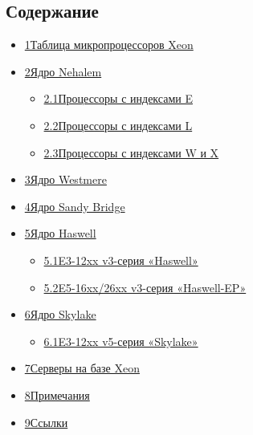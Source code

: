 \documentclass[a4paper,11pt]{article}
\begin{document}
\subsection{Содержание}
\begin{itemize}
	\item \hyperlink{Таблица_микропроцессоров_Xeon}{1Таблица микропроцессоров Xeon}
	\item \hyperlink{Ядро_Nehalem}{2Ядро Nehalem}
\begin{itemize}
	\item \hyperlink{Процессоры_с_индексами_E}{2.1Процессоры с индексами E}
	\item \hyperlink{Процессоры_с_индексами_L}{2.2Процессоры с индексами L}
	\item \hyperlink{Процессоры_с_индексами_W_и_X}{2.3Процессоры с индексами W и X}
\end{itemize}
	\item \hyperlink{Ядро_Westmere}{3Ядро Westmere}
	\item \hyperlink{Ядро_Sandy_Bridge}{4Ядро Sandy Bridge}
	\item \hyperlink{Ядро_Haswell}{5Ядро Haswell}
\begin{itemize}
	\item \hyperlink{E3-12xx_v3-серия_«Haswell»}{5.1E3-12xx v3-серия «Haswell»}
	\item \hyperlink{E5-16xx/26xx_v3-серия_«Haswell-EP»}{5.2E5-16xx/26xx v3-серия «Haswell-EP»}
\end{itemize}
	\item \hyperlink{Ядро_Skylake}{6Ядро Skylake}
\begin{itemize}
	\item \hyperlink{E3-12xx_v5-серия_«Skylake»}{6.1E3-12xx v5-серия «Skylake»}
\end{itemize}
	\item \hyperlink{Серверы_на_базе_Xeon}{7Серверы на базе Xeon}
	\item \hyperlink{Примечания}{8Примечания}
	\item \hyperlink{Ссылки}{9Ссылки}
\end{itemize}
\end{document}
